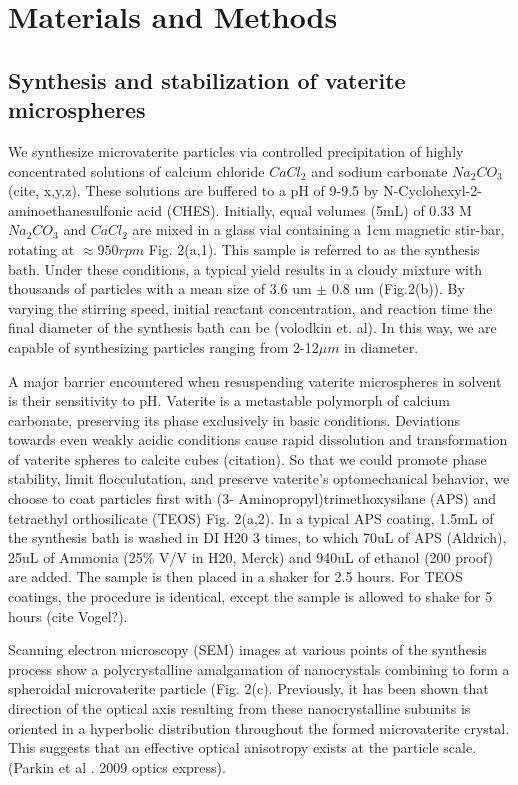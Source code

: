 \section*{Materials and Methods}
\subsection*{Synthesis and stabilization of vaterite microspheres}
We synthesize microvaterite particles via controlled precipitation of highly concentrated solutions of calcium chloride $CaCl_{2}$ and sodium carbonate $Na_{2}CO_{3}$ (cite, x,y,z). These solutions are buffered to a pH of 9-9.5 by N-Cyclohexyl-2-aminoethanesulfonic acid (CHES). Initially, equal volumes (5mL) of 0.33 M $Na_{2}CO_{3}$ and $CaCl_2$ are mixed in a glass vial containing a 1cm magnetic stir-bar, rotating at $\approx 950rpm$ Fig. 2(a,1). This sample is referred to as the synthesis bath. Under these conditions, a typical yield results in a cloudy mixture with  thousands of particles with a mean size of 3.6 um $\pm$ 0.8 um (Fig.2(b)). By varying the stirring speed, initial reactant concentration, and reaction time the final diameter of the synthesis bath can be  (volodkin et. al). In this way, we are capable of synthesizing particles ranging from 2-12$\mu m$ in diameter.

A major barrier encountered when resuspending vaterite microspheres in solvent is their sensitivity to pH. Vaterite is a metastable polymorph of calcium carbonate, preserving its phase exclusively in basic conditions. Deviations towards even weakly acidic conditions cause rapid dissolution and transformation of vaterite spheres to calcite cubes (citation). So that we could promote phase stability, limit flocculutation, and preserve vaterite's optomechanical behavior, we choose to coat particles first with (3- Aminopropyl)trimethoxysilane (APS) and tetraethyl orthosilicate (TEOS) Fig. 2(a,2). In a typical APS coating, 1.5mL of the synthesis bath is washed in DI H20 3 times, to which 70uL of APS (Aldrich), 25uL of Ammonia (25\% V/V in H20, Merck) and 940uL of ethanol (200 proof) are added. The sample is then placed in a shaker for 2.5 hours. For TEOS coatings, the procedure is identical, except the sample is allowed to shake for 5 hours (cite Vogel?). 

Scanning electron microscopy (SEM) images at various points of the synthesis process show a polycrystalline amalgamation of nanocrystals combining to form a spheroidal microvaterite particle (Fig. 2(c). Previously, it has been shown that direction of the optical axis resulting from these nanocrystalline subunits is oriented in a hyperbolic distribution throughout the formed microvaterite crystal. This suggests that an effective optical anisotropy exists at the particle scale. (Parkin et al . 2009 optics express).
